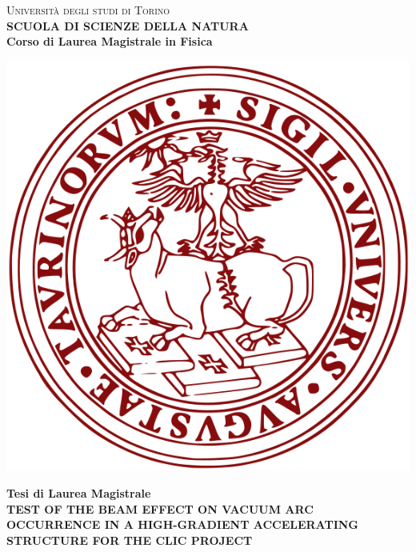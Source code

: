 \begin{titlepage}
\begin{center}
{{\Large{\textsc{Universit\`a degli studi di Torino \\}}}} \vspace{5mm} {\small{\bf SCUOLA DI SCIENZE DELLA NATURA\\ \vspace{3mm}
Corso di Laurea Magistrale in Fisica}}
\vspace{5mm}
\end{center}
\begin{center}
\includegraphics[scale=.3]{head/logo.png}
\end{center}
\begin{center}
\vspace{5mm}
{\large{\bf Tesi di Laurea Magistrale\\}}
\vspace{5mm}
{\LARGE{\bf TEST OF THE BEAM EFFECT ON VACUUM ARC OCCURRENCE IN A HIGH-GRADIENT ACCELERATING STRUCTURE FOR THE CLIC PROJECT\\}}
\end{center}
\vspace{11mm}
\par

\end{titlepage}

